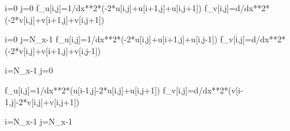 \documentclass[
  letterpaper,
  DIV=11,
  numbers=noendperiod]{scrreprt}
\newenvironment{Shaded}{\begin{snugshade}}{\end{snugshade}}
\newcommand{\DecValTok}[1]{\textcolor[rgb]{0.68,0.00,0.00}{#1}}
\newcommand{\NormalTok}[1]{\textcolor[rgb]{0.00,0.23,0.31}{#1}}
\newcommand{\OperatorTok}[1]{\textcolor[rgb]{0.37,0.37,0.37}{#1}}
\theoremstyle{plain}
\theoremstyle{definition}
\theoremstyle{plain}
\theoremstyle{remark}
\begin{document}
\begin{Shaded}
\begin{Highlighting}[]
\NormalTok{    i}\OperatorTok{=}\DecValTok{0}
\NormalTok{    j}\OperatorTok{=}\DecValTok{0}
\NormalTok{    f\_u[i,j]}\OperatorTok{=}\DecValTok{1}\OperatorTok{/}\NormalTok{dx}\OperatorTok{**}\DecValTok{2}\OperatorTok{*}\NormalTok{(}\OperatorTok{{-}}\DecValTok{2}\OperatorTok{*}\NormalTok{u[i,j]}\OperatorTok{+}\NormalTok{u[i}\OperatorTok{+}\DecValTok{1}\NormalTok{,j]}\OperatorTok{+}\NormalTok{u[i,j}\OperatorTok{+}\DecValTok{1}\NormalTok{]) }
\NormalTok{    f\_v[i,j]}\OperatorTok{=}\NormalTok{d}\OperatorTok{/}\NormalTok{dx}\OperatorTok{**}\DecValTok{2}\OperatorTok{*}\NormalTok{(}\OperatorTok{{-}}\DecValTok{2}\OperatorTok{*}\NormalTok{v[i,j]}\OperatorTok{+}\NormalTok{v[i}\OperatorTok{+}\DecValTok{1}\NormalTok{,j]}\OperatorTok{+}\NormalTok{v[i,j}\OperatorTok{+}\DecValTok{1}\NormalTok{]) }

\NormalTok{    i}\OperatorTok{=}\DecValTok{0}
\NormalTok{    j}\OperatorTok{=}\NormalTok{N\_x}\OperatorTok{{-}}\DecValTok{1}
\NormalTok{    f\_u[i,j]}\OperatorTok{=}\DecValTok{1}\OperatorTok{/}\NormalTok{dx}\OperatorTok{**}\DecValTok{2}\OperatorTok{*}\NormalTok{(}\OperatorTok{{-}}\DecValTok{2}\OperatorTok{*}\NormalTok{u[i,j]}\OperatorTok{+}\NormalTok{u[i}\OperatorTok{+}\DecValTok{1}\NormalTok{,j]}\OperatorTok{+}\NormalTok{u[i,j}\OperatorTok{{-}}\DecValTok{1}\NormalTok{]) }
\NormalTok{    f\_v[i,j]}\OperatorTok{=}\NormalTok{d}\OperatorTok{/}\NormalTok{dx}\OperatorTok{**}\DecValTok{2}\OperatorTok{*}\NormalTok{(}\OperatorTok{{-}}\DecValTok{2}\OperatorTok{*}\NormalTok{v[i,j]}\OperatorTok{+}\NormalTok{v[i}\OperatorTok{+}\DecValTok{1}\NormalTok{,j]}\OperatorTok{+}\NormalTok{v[i,j}\OperatorTok{{-}}\DecValTok{1}\NormalTok{]) }

\NormalTok{    i}\OperatorTok{=}\NormalTok{N\_x}\OperatorTok{{-}}\DecValTok{1}
\NormalTok{    j}\OperatorTok{=}\DecValTok{0}

\NormalTok{    f\_u[i,j]}\OperatorTok{=}\DecValTok{1}\OperatorTok{/}\NormalTok{dx}\OperatorTok{**}\DecValTok{2}\OperatorTok{*}\NormalTok{(u[i}\OperatorTok{{-}}\DecValTok{1}\NormalTok{,j]}\OperatorTok{{-}}\DecValTok{2}\OperatorTok{*}\NormalTok{u[i,j]}\OperatorTok{+}\NormalTok{u[i,j}\OperatorTok{+}\DecValTok{1}\NormalTok{]) }
\NormalTok{    f\_v[i,j]}\OperatorTok{=}\NormalTok{d}\OperatorTok{/}\NormalTok{dx}\OperatorTok{**}\DecValTok{2}\OperatorTok{*}\NormalTok{(v[i}\OperatorTok{{-}}\DecValTok{1}\NormalTok{,j]}\OperatorTok{{-}}\DecValTok{2}\OperatorTok{*}\NormalTok{v[i,j]}\OperatorTok{+}\NormalTok{v[i,j}\OperatorTok{+}\DecValTok{1}\NormalTok{]) }
    
\NormalTok{    i}\OperatorTok{=}\NormalTok{N\_x}\OperatorTok{{-}}\DecValTok{1}
\NormalTok{    j}\OperatorTok{=}\NormalTok{N\_x}\OperatorTok{{-}}\DecValTok{1}



\end{Highlighting}
\end{Shaded}
\end{document}

